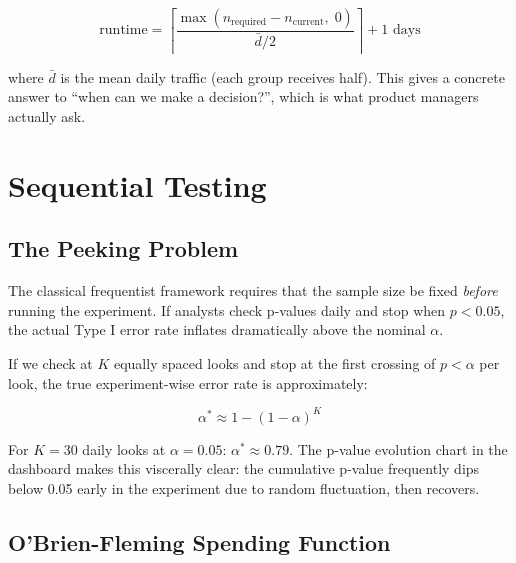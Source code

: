 \begin{equation}
  \mathrm{runtime} = \left\lceil
    \frac{\max(n_{\mathrm{required}} - n_{\mathrm{current}},\; 0)}
    {\bar{d}/2}
  \right\rceil + 1 \text{ days}
\end{equation}

where $\bar{d}$ is the mean daily traffic (each group receives half). This gives
a concrete answer to ``when can we make a decision?'', which is what product
managers actually ask.

\section{Sequential Testing}
\label{sec:abtest-sequential}


\subsection{The Peeking Problem}

The classical frequentist framework requires that the sample size be fixed
\emph{before} running the experiment. If analysts check p-values daily and stop
when $p < 0.05$, the actual Type I error rate inflates dramatically above
the nominal $\alpha$.

If we check at $K$ equally spaced looks and stop at the first crossing of
$p < \alpha$ per look, the true experiment-wise error rate is approximately:

\begin{equation}
  \alpha^* \approx 1 - (1 - \alpha)^K
\end{equation}

For $K = 30$ daily looks at $\alpha = 0.05$: $\alpha^* \approx 0.79$. The
p-value evolution chart in the dashboard makes this viscerally clear: the
cumulative p-value frequently dips below 0.05 early in the experiment due to
random fluctuation, then recovers.

\subsection{O'Brien-Fleming Spending Function}

